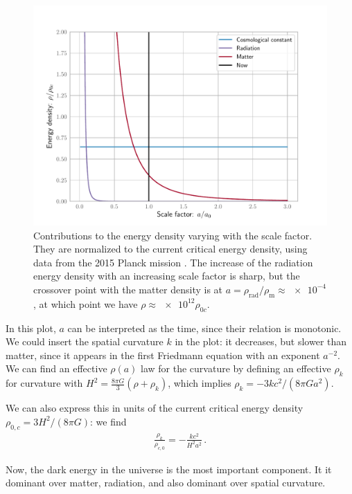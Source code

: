 \documentclass[main.tex]{subfiles}
\begin{document}
\begin{figure}[ht]
\centering
\includegraphics[width=\textwidth]{figures/global_energy_contributions.pdf}
\caption{Contributions to the energy density varying with the scale factor. They are normalized to the current critical energy density, using data from the 2015 Planck mission \cite{PlanckCollaboration:2016XIII}. The increase of the radiation energy density with an increasing scale factor is sharp, but the crossover point with the matter density is at \(a = \rho_{\text{rad}}/\rho_{\text{m}} \approx \num{e-4}\), at which point we have \(\rho \approx \num{e12} \rho_{0c}\).}
\label{fig:global_energy_contributions}
\end{figure}

In this plot, \(a\) can be interpreted as the time, since their relation is monotonic.
We could insert the spatial curvature \(k\) in the plot: it decreases, but slower than matter, since it appears in the first Friedmann equation with an exponent \(a^{-2}\).
We can find an effective \(\rho (a)\) law for the curvature by defining an effective \(\rho_{k}\) for curvature with \(H^2 = \frac{8 \pi G}{3} (\rho + \rho_{k})\), which implies \(\rho_{k} = - 3 k c^2 / (8 \pi G a^2)\). 

We can also express this in units of the current critical energy density \(\rho_{0,c} = 3 H^2 / (8 \pi G)\): we find 
%
\begin{align} \label{eq:spatial-curvature-effective-density}
\frac{\rho_{k}}{\rho_{c, 0}} = - \frac{kc^2}{H^2a^2}
\,.
\end{align}

Now, the dark energy in the universe is the most important component. It it dominant over matter, radiation, and also dominant over spatial curvature.
\end{document}
